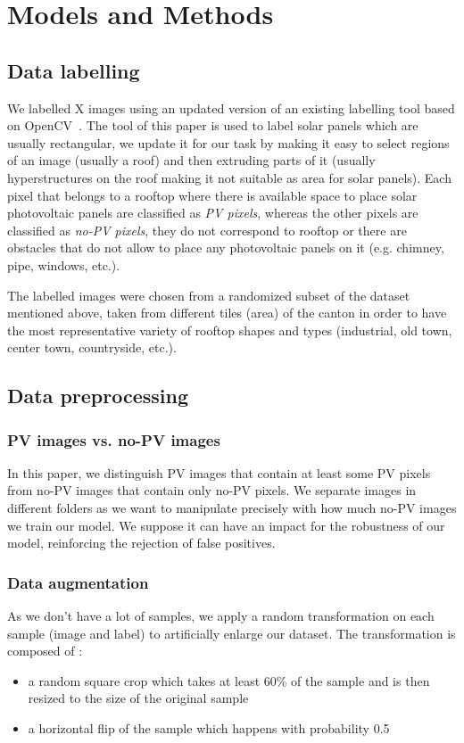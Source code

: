 \documentclass[10pt,conference]{IEEEtran}
\begin{document}
\section{Models and Methods}

\subsection{Data labelling}
We labelled X images using an updated version of an existing labelling tool based on OpenCV~\cite{Castello_2019}. The tool of this paper is used to label solar panels which are usually rectangular, we update it for our task by making it easy to select regions of an image (usually a roof) and then extruding parts of it (usually hyperstructures on the roof making it not suitable as area for solar panels). Each pixel that belongs to a rooftop where there is available space to place solar photovoltaic panels are classified as \emph{PV pixels}, whereas the other pixels are classified as \emph{no-PV pixels}, they do not correspond to rooftop or there are obstacles that do not allow to place any photovoltaic panels on it (e.g. chimney, pipe, windows, etc.).

The labelled images were chosen from a randomized subset of the dataset mentioned above, taken from different tiles (area) of the canton in order to have the most representative variety of rooftop shapes and types (industrial, old town, center town, countryside, etc.). 

\subsection{Data preprocessing}

\subsubsection{PV images vs. no-PV images}
In this paper, we distinguish PV images that contain at least some PV pixels from no-PV images that contain only no-PV pixels. We separate images in different folders as we want to manipulate precisely with how much no-PV images we train our model. We suppose it can have an impact for the robustness of our model, reinforcing the rejection of false positives.  

\subsubsection{Data augmentation}
As we don’t have a lot of samples, we apply a random transformation on each sample (image and label) to artificially enlarge our dataset. The transformation is composed of :  
\begin{itemize}
	\item a random square crop which takes at least 60\% of the sample and is then resized to the size of the original sample
	\item a horizontal flip of the sample which happens with probability 0.5
\end{itemize}
  
\end{document}
